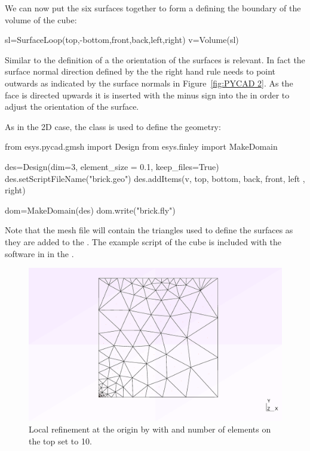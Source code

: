 We can now put the six surfaces together to form a  defining the
boundary of the volume of the cube:
\begin{python}
sl=SurfaceLoop(top,-bottom,front,back,left,right)
v=Volume(sl)
\end{python}
Similar to the definition of a  the orientation of the surfaces  is relevant. In fact the surface normal direction defined by the the right hand rule needs to point outwards as indicated by the surface normals in
Figure~\ref{fig:PYCAD 2}. As the  face is directed upwards it is inserted with the minus sign 
into the  in order to adjust the orientation of the surface. 

As in the 2D case, the  class is used to define the geometry:
\begin{python}
from esys.pycad.gmsh import Design
from esys.finley import MakeDomain

des=Design(dim=3, element_size = 0.1, keep_files=True)
des.setScriptFileName("brick.geo")
des.addItems(v, top, bottom, back, front, left , right)

dom=MakeDomain(des)
dom.write("brick.fly")
\end{python}
Note that the \finley mesh file  will contain the 
triangles used to define the surfaces as they are added to the .
The example script of the cube is included with the software in
 in the \ExampleDirectory. 

\begin{figure}
\centerline{\includegraphics[width=\figwidth]{figures/refine1.eps}}
\caption{Local refinement at the origin by
with  and number of elements on the top set to 10.}
\label{fig:PYCAD 5}
\end{figure}

